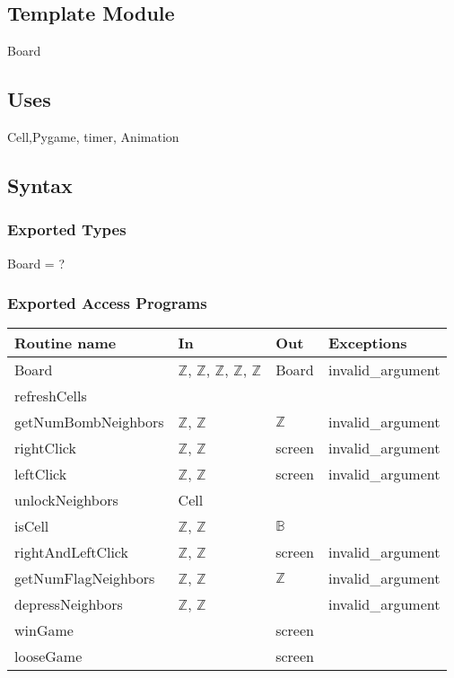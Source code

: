 \documentclass[12pt]{article}
\begin{document}
\subsection{Template Module}

Board

\subsection {Uses}

Cell,Pygame, timer, Animation

\subsection {Syntax}

\subsubsection {Exported Types}

Board = ?

\subsubsection {Exported Access Programs}

\begin{tabular}{| l | l | l | l |}
\hline
\textbf{Routine name} & \textbf{In} & \textbf{Out} & \textbf{Exceptions}\\
\hline
Board & $\mathbb{Z}$, $\mathbb{Z}$, $\mathbb{Z}$, $\mathbb{Z}$, $\mathbb{Z}$ & Board & invalid\_argument\\
\hline
refreshCells & ~ & ~ & ~\\
\hline
getNumBombNeighbors & $\mathbb{Z}$, $\mathbb{Z}$ & $\mathbb{Z}$ & invalid\_argument\\
\hline
rightClick & $\mathbb{Z}$, $\mathbb{Z}$ & screen & invalid\_argument\\
\hline
leftClick & $\mathbb{Z}$, $\mathbb{Z}$ & screen & invalid\_argument\\
\hline
unlockNeighbors & Cell & ~ & ~\\
\hline
isCell & $\mathbb{Z}$, $\mathbb{Z}$ &  $\mathbb{B}$  & ~\\
\hline
rightAndLeftClick & $\mathbb{Z}$, $\mathbb{Z}$ & screen & invalid\_argument\\
\hline
getNumFlagNeighbors & $\mathbb{Z}$, $\mathbb{Z}$ & $\mathbb{Z}$ & invalid\_argument\\
\hline
depressNeighbors & $\mathbb{Z}$, $\mathbb{Z}$ & ~ & invalid\_argument\\
\hline
winGame & ~ & screen & ~\\
\hline
looseGame & ~ & screen & ~\\
\hline
\end{tabular}
\end{document}
